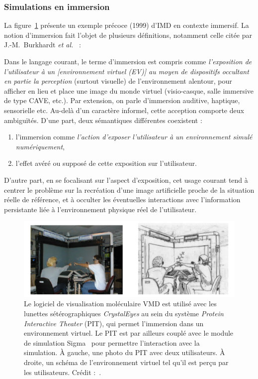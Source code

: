 	\subsubsection{Simulations en immersion}
	La figure~\ref{fig:steeredPIT} présente un exemple précoce (1999) d'IMD en contexte immersif. La notion d'immersion fait l'objet de plusieurs définitions, notamment celle citée par J.-M.~Burkhardt \emph{et al.}~\cite{burkhardt2003immersion} :
	
	\begin{displayquote}
		Dans le langage courant, le terme d'immersion est compris comme \emph{l'exposition de l'utilisateur à un [environnement virtuel (EV)] au moyen de dispositifs occultant en partie la perception} (surtout visuelle) de l'environnement alentour, pour afficher en lieu et place une image du monde virtuel (visio-casque, salle immersive de type CAVE, etc.). Par extension, on parle d'immersion auditive, haptique, sensorielle etc. Au-delà d'un caractère informel, cette acception comporte deux ambiguïtés. D'une part, deux sémantiques différentes coexistent :
	    \begin{enumerate}
	        \item l'immersion comme \emph{l'action d'exposer l'utilisateur à un environnement simulé numériquement},
	        \item l'effet avéré ou supposé de cette exposition sur l'utilisateur.
	    \end{enumerate}
	    
	    D'autre part, en se focalisant sur l'aspect d'exposition, cet usage courant tend à centrer le problème sur la recréation d'une image artificielle proche de la situation réelle de référence, et à occulter les éventuelles interactions avec l'information persistante liée à l'environnement physique réel de l'utilisateur.	    
	\end{displayquote}
	
	\begin{figure}[!htbp]
		\centering
		\includegraphics[width=\textwidth]{figures/ch1/steeredPIT}
		\caption[Dynamique moléculaire interactive en environnement virtuel]{Le logiciel de visualisation moléculaire VMD est utilisé avec les lunettes sétérographiques \emph{CrystalEyes} au sein du système \emph{Protein Interactive Theater} (PIT), qui permet l'immersion dans un environnement virtuel. Le PIT est par ailleurs couplé avec le module de simulation Sigma~\cite{mann2002sigma} pour permettre l'interaction avec la simulation. À gauche, une photo du PIT avec deux utilisateurs. À droite, un schéma de l'environnement virtuel tel qu'il est perçu par les utilisateurs. Crédit :~\cite{prins1999virtual}.}
		\label{fig:steeredPIT}
	\end{figure}
	
